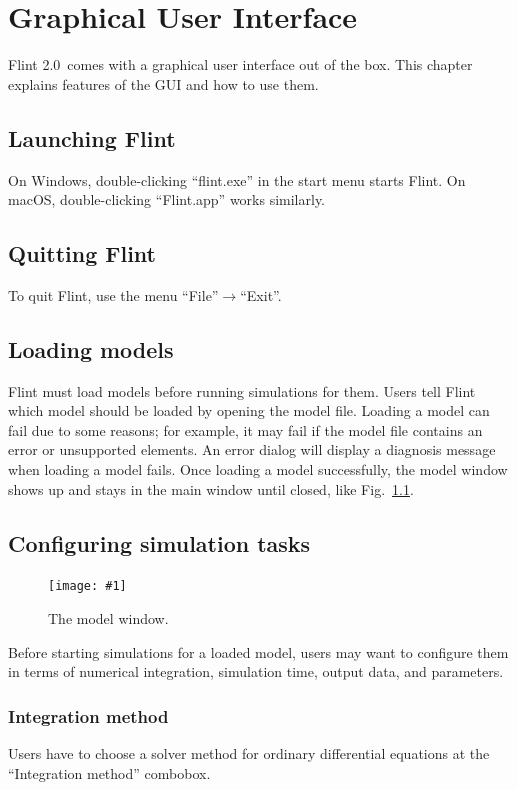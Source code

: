 \documentclass[a4paper,10pt]{report}
\def\FlintVersion{2.0}
\def\Flint{Flint \FlintVersion}
\newcommand\FigureOfImage[2]{\begin{figure}[h]
  \centering
  \texttt{[image: \#1]}
  \caption{#2}\label{fig:#1}
\end{figure}}
\begin{document}

\chapter{Graphical User Interface}
\Flint\ comes with a graphical user interface out of the box. This chapter
explains features of the GUI and how to use them.

\section{Launching Flint}
On Windows, double-clicking ``flint.exe'' in the start menu starts Flint.
On macOS, double-clicking ``Flint.app'' works similarly.

\section{Quitting Flint}
To quit Flint, use the menu ``File''$\rightarrow$``Exit''.

\section{Loading models}
Flint must load models before running simulations for them.
Users tell Flint which model should be loaded by opening the model file.
Loading a model can fail due to some reasons; for example, it may fail if
the model file contains an error or unsupported elements.
An error dialog will display a diagnosis message when loading a model fails.
Once loading a model successfully, the model window shows up and stays
in the main window until closed, like Fig.~\ref{fig:lr}.

\section{Configuring simulation tasks}
\FigureOfImage{lr}{The model window.}
Before starting simulations for a loaded model, users may want to configure them
in terms of numerical integration, simulation time, output data, and parameters.

\subsection{Integration method}
Users have to choose a solver method for ordinary differential equations at the
``Integration method'' combobox.
\end{document}
